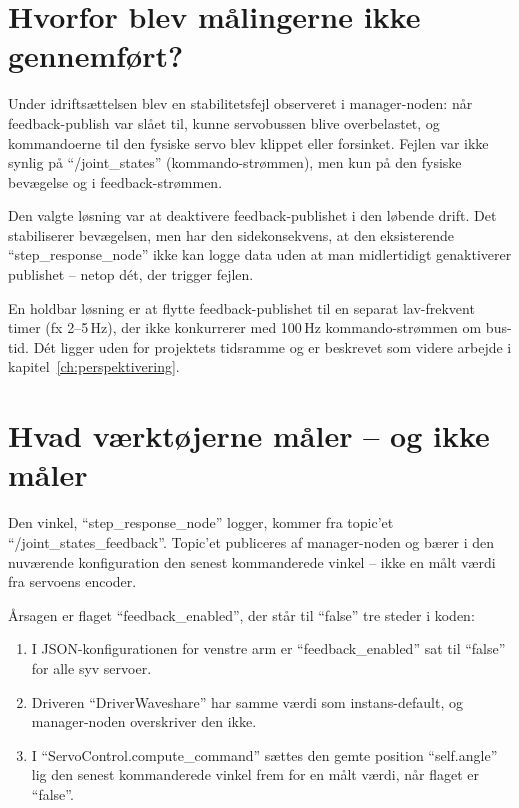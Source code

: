 \section{Hvorfor blev målingerne ikke gennemført?}

Under idriftsættelsen blev en stabilitetsfejl observeret i
manager-noden: når feedback-publish var slået til, kunne
servobussen blive overbelastet, og kommandoerne til den fysiske
servo blev klippet eller forsinket. Fejlen var ikke synlig på
\enquote{/joint\_states} (kommando-strømmen), men kun på den
fysiske bevægelse og i feedback-strømmen.

Den valgte løsning var at deaktivere feedback-publishet i den
løbende drift. Det stabiliserer bevægelsen, men har den
sidekonsekvens, at den eksisterende
\enquote{step\_response\_node} ikke kan logge data uden at man
midlertidigt genaktiverer publishet -- netop dét, der trigger
fejlen.

En holdbar løsning er at flytte feedback-publishet til en separat
lav-frekvent timer (fx 2--5\,Hz), der ikke konkurrerer med 100\,Hz
kommando-strømmen om bus-tid. Dét ligger uden for projektets
tidsramme og er beskrevet som videre arbejde i
kapitel~\ref{ch:perspektivering}.

\clearpage
\section{Hvad værktøjerne måler -- og ikke måler}
\label{sec:hvad-maaler-vi}

Den vinkel, \enquote{step\_response\_node} logger, kommer fra topic'et
\enquote{/joint\_states\_feedback}. Topic'et publiceres af
manager-noden og bærer i den nuværende konfiguration den senest
kommanderede vinkel -- ikke en målt værdi fra servoens encoder.

Årsagen er flaget \enquote{feedback\_enabled}, der står til
\enquote{false} tre steder i koden:

\begin{enumerate}
    \item I JSON-konfigurationen for venstre arm er
          \enquote{feedback\_enabled} sat til \enquote{false} for alle
          syv servoer.
    \item Driveren \enquote{DriverWaveshare} har samme værdi som
          instans-default, og manager-noden overskriver den ikke.
    \item I \enquote{ServoControl.compute\_command} sættes den
          gemte position \enquote{self.angle} lig den senest
          kommanderede vinkel frem for en målt værdi, når flaget er
          \enquote{false}.
\end{enumerate}

